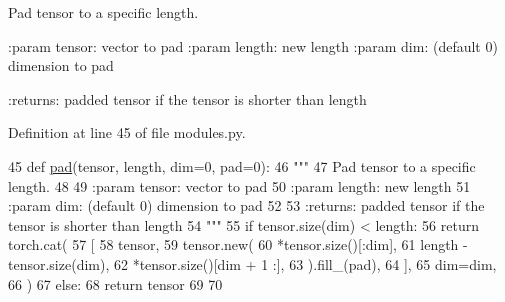\begin{DoxyVerb}Pad tensor to a specific length.

:param tensor: vector to pad
:param length: new length
:param dim: (default 0) dimension to pad

:returns: padded tensor if the tensor is shorter than length
\end{DoxyVerb}
 

Definition at line 45 of file modules.\+py.


\begin{DoxyCode}
45 \textcolor{keyword}{def }\hyperlink{namespaceprojects_1_1controllable__dialogue_1_1controllable__seq2seq_1_1modules_abdf83fbfd5a42f32b931c6fbae972dde}{pad}(tensor, length, dim=0, pad=0):
46     \textcolor{stringliteral}{"""}
47 \textcolor{stringliteral}{    Pad tensor to a specific length.}
48 \textcolor{stringliteral}{}
49 \textcolor{stringliteral}{    :param tensor: vector to pad}
50 \textcolor{stringliteral}{    :param length: new length}
51 \textcolor{stringliteral}{    :param dim: (default 0) dimension to pad}
52 \textcolor{stringliteral}{}
53 \textcolor{stringliteral}{    :returns: padded tensor if the tensor is shorter than length}
54 \textcolor{stringliteral}{    """}
55     \textcolor{keywordflow}{if} tensor.size(dim) < length:
56         \textcolor{keywordflow}{return} torch.cat(
57             [
58                 tensor,
59                 tensor.new(
60                     *tensor.size()[:dim],
61                     length - tensor.size(dim),
62                     *tensor.size()[dim + 1 :],
63                 ).fill\_(pad),
64             ],
65             dim=dim,
66         )
67     \textcolor{keywordflow}{else}:
68         \textcolor{keywordflow}{return} tensor
69 
70 
\end{DoxyCode}
